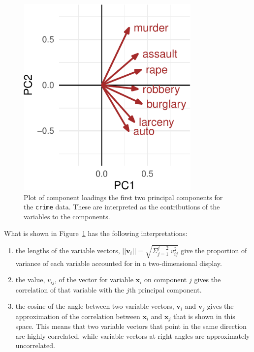 \documentclass[
  letterpaper,
  10pt,
  krantz2]{krantz}
\begin{document}
\begin{figure}[H]

{\centering \includegraphics[width=0.8\textwidth,height=\textheight]{figs/ch04/fig-crime-vectors-1.pdf}

}

\caption{\label{fig-crime-vectors}Plot of component loadings the first
two principal components for the \texttt{crime} data. These are
interpreted as the contributions of the variables to the components.}

\end{figure}

What is shown in Figure~\ref{fig-crime-vectors} has the following
interpretations:

\begin{enumerate}
\def\labelenumi{(\arabic{enumi})}
\item
  the lengths of the variable vectors,
  \(||\mathbf{v}_i|| = \sqrt{\Sigma_{j = 1}^{j=2} \; v_{ij}^2}\) give
  the proportion of variance of each variable accounted for in a
  two-dimensional display.
\item
  the value, \(v_{ij}\), of the vector for variable \(\mathbf{x}_i\) on
  component \(j\) gives the correlation of that variable with the
  \(j\)th principal component.
\item
  the cosine of the angle between two variable vectors, \(\mathbf{v}_i\)
  and \(\mathbf{v}_j\) gives the approximation of the correlation
  between \(\mathbf{x}_i\) and \(\mathbf{x}_j\) that is shown in this
  space. This means that two variable vectors that point in the same
  direction are highly correlated, while variable vectors at right
  angles are approximately uncorrelated.
\end{enumerate}
\end{document}
